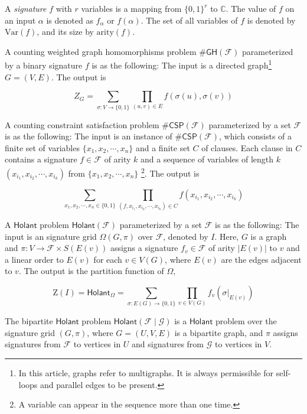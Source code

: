 \documentclass[a4paper,UKenglish,cleveref, autoref, thm-restate]{lipics-v2021}
\newcommand{\hol}[0]{\textsf{Holant}}
\newcommand{\csp}[0]{\textsf{CSP}}
\begin{document}
A \textit{signature} $f$ with $r$ variables is a mapping from $\{0,1\}^r$ to $\mathbb{C}$. The value of $f$ on an input $\alpha$ is denoted as $f_{\alpha}$ or $f(\alpha)$. The set of all variables of $f$ is denoted by $\text{Var}(f)$, and its size by $\text{arity}(f)$. 
\begin{definition}[\#$\textsf{GH}$]
    A counting weighted graph homomorphisms problem $\#\textsf{GH}(\mathcal{F})$ parameterized by a binary signature $f$ is as the following: The input is a directed graph\footnote{In this article, graphs refer to multigraphs. It is always permissible for self-loops and parallel edges to be present.} $G = (V,E)$. The output is 

$$Z_G=\sum_{\sigma:V\to \{0,1\}}\prod_{(u,v)\in E} f(\sigma(u),\sigma(v))$$
\label{def:GH}
\end{definition}

\begin{definition}[$\#\csp$]
    A counting constraint satisfaction problem $\#\csp(\mathcal{F})$ parameterized by a set $\mathcal{F}$ is as the following: The input is an instance of $\#\csp(\mathcal{F})$, which consists of a finite set of variables $\{x_1,x_2,\cdots,x_n\}$ and a finite set $C$ of clauses. Each clause in $C$ contains a signature $f\in \mathcal{F}$ of arity $k$ and a sequence of variables of length $k$ $(x_{i_1},x_{i_2},\cdots,x_{i_k})$ from $\{x_1,x_2,\cdots,x_n\}$ \footnote{A variable can appear in the sequence more than one time.}. The output is 

$$\sum_{x_1,x_2,\cdots,x_n\in\{0,1\}}\prod_{(f,x_{i_1},x_{i_2},\cdots,x_{i_k})\in C}f(x_{i_1},x_{i_2},\cdots,x_{i_k})$$
\label{def:CSP}
\end{definition}


\begin{definition}[$\hol$]
    A $\hol$ problem $\hol(\mathcal{F})$ parameterized by a set $\mathcal{F}$ is as the following: The input is an signature grid $\Omega(G,\pi)$ over $\mathcal{F}$, denoted by $I$. Here, $G$ is a graph and $\pi:V\to \mathcal{F}\times S(E(v))$ assigns a signature $f_v\in\mathcal{F}$ of arity $|E(v)|$ to $v$ and a linear order to $E(v)$ for each $v\in V(G)$, where $E(v)$ are the edges adjacent to $v$. The output is the partition function of $\Omega$,

$$\text{Z}(I)=\hol_\Omega=\sum_{\sigma:E(G)\to\{0,1\}}\prod_{v\in V(G)}f_v(\sigma|_{E(v)})$$

The bipartite $\hol$ problem $\hol(\mathcal{F}\mid\mathcal G)$ is a $\hol$ problem over the signature grid $(G,\pi)$, where $G=(U,V,E)$ is a bipartite graph, and $\pi$ assigns signatures from $\mathcal F$ to vertices in $U$ and signatures from $\mathcal{G}$ to vertices in $V$.
\label{def:holant}
\end{definition}
\end{document}
